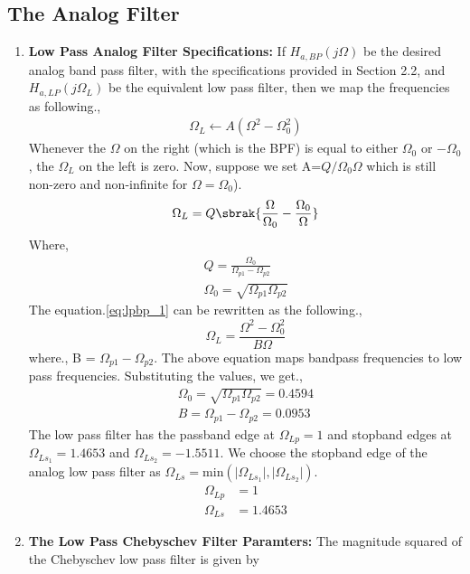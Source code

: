 \documentclass[journal,12pt,twocolumn]{IEEEtran}
\begin{document}
\subsection{The Analog Filter}
\begin{enumerate}
\item \textbf{Low Pass Analog Filter Specifications:}  If $H_{a, BP}(j\Omega)$ be the desired analog band
pass filter,  with the specifications provided in Section 2.2, and $H_{a,LP}(j\Omega_L)$ 
be the equivalent low pass filter, then we map the frequencies as following.,
\begin{align}
\Omega_L \xleftarrow{} A(\Omega^2 - \Omega_{0}^{2})
\end{align}
Whenever the $\Omega$ on the right (which is the BPF) is equal to either  $\Omega_0$ or $-\Omega_0$ , the $\Omega_{L}$ on the left is zero. 
Now, suppose we set A=$Q/\Omega_0 \Omega$ which is still non-zero and non-infinite for $\Omega=\Omega_0$).
\begin{align}
    \Omega_L = Q\sbrak{\frac{\Omega}{\Omega_0}-\frac{\Omega_0}{\Omega}} \label{eq:lpbp_1}
\end{align}
Where,
\begin{align}
    Q = \frac{\Omega_0}{\Omega_{p1} -\Omega_{p2}}\\
    \Omega_0 = \sqrt{\Omega_{p1} \Omega_{p2}}
\end{align}
The equation.\ref{eq:lpbp_1} can be rewritten as the following.,
\begin{equation}
\label{lpbp_2}
\Omega_L = \frac{\Omega^2 - \Omega_0^2}{B\Omega}
\end{equation}
where., B = $\Omega_{p1} -\Omega_{p2}$.
The above equation maps bandpass frequencies to low pass frequencies.
Substituting the values, we get.,
\begin{align}
\Omega_0 = \sqrt{\Omega_{p1}\Omega_{p2}} = 0.4594\\
B = \Omega_{p1} - \Omega_{p2} = 0.0953 
\end{align}
The low pass filter has
the passband edge at $\Omega_{Lp} = 1$ and stopband edges at $\Omega_{Ls_1} = 1.4653$ and $\Omega_{Ls_2} = -1.5511$.  We choose the stopband edge of the analog low pass filter as $\Omega_{Ls} = \mbox{min}(\vert \Omega_{Ls_1}\vert,\vert \Omega_{Ls_2}\vert)$.
\begin{align}
    \Omega_{Lp} &= 1\\
    \Omega_{Ls} &= 1.4653
\end{align}
\item \textbf{The Low Pass Chebyschev Filter Paramters:}  The magnitude squared of the Chebyschev low pass filter is given by 

\end{enumerate}
\end{document}
